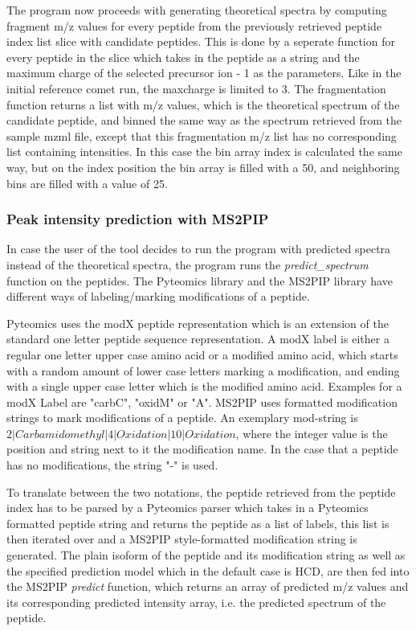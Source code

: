 \documentclass[11pt]{article}
\begin{document}
The program now proceeds with generating theoretical spectra by computing fragment m/z values for every peptide from the previously retrieved peptide index list slice with candidate peptides. This is done by a seperate function for every peptide in the slice which takes in the peptide as a string and the maximum charge of the selected precursor ion - 1 as the parameters. Like in the initial reference comet run, the maxcharge is limited to 3. The fragmentation function returns a list with m/z values, which is the theoretical spectrum of the candidate peptide, and binned the same way as the spectrum retrieved from the sample mzml file, except that this fragmentation m/z list has no corresponding list containing intensities. In this case the bin array index is calculated the same way, but on the index position the bin array is filled with a 50, and neighboring bins are filled with a value of 25. 

\subsubsection{Peak intensity prediction with MS2PIP}
In case the user of the tool decides to run the program with predicted spectra instead of the theoretical spectra, the program runs the \textit{predict\_spectrum} function on the peptides. The Pyteomics library and the MS2PIP library have different ways of labeling/marking modifications of a peptide. 

Pyteomics uses the modX peptide representation which is an extension of the standard one letter peptide sequence representation. A modX label is either a regular one letter upper case amino acid or a modified amino acid, which starts with a random amount of lower case letters marking a modification, and ending with a single upper case letter which is the modified amino acid. Examples for a modX Label are "carbC", "oxidM" or "A". MS2PIP uses formatted modification strings to mark modifications of a peptide. An exemplary mod-string is \begin{math}2|Carbamidomethyl|4|Oxidation|10|Oxidation\end{math}, where the integer value is the position and string next to it the modification name. In the case that a peptide has no modifications, the string "-" is used. 

To translate between the two notations, the peptide retrieved from the peptide index has to be parsed by a Pyteomics parser which takes in a Pyteomics formatted peptide string and returns the peptide as a list of labels, this list is then iterated over and a MS2PIP style-formatted modification string is generated. The plain isoform of the peptide and its modification string as well as the specified prediction model which in the default case is HCD, are then fed into the MS2PIP \textit{predict} function, which returns an array of predicted m/z values and its corresponding predicted intensity array, i.e. the predicted spectrum of the peptide.
\end{document}
